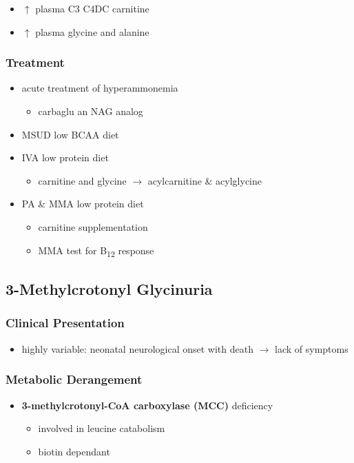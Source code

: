 \documentclass{scrartcl}
\begin{document}
\begin{enumerate}
\begin{itemize}
\item \(\uparrow\) plasma C3 \textpm{} C4DC carnitine
\item \(\uparrow\) plasma glycine and alanine
\end{itemize}
\end{enumerate}

\subsubsection{Treatment}
\label{sec:org70468b2}
\begin{itemize}
\item acute treatment of hyperammonemia
\begin{itemize}
\item carbaglu an NAG analog
\end{itemize}
\item MSUD low BCAA diet
\item IVA low protein diet
\begin{itemize}
\item carnitine and glycine \(\to\) acylcarnitine \& acylglycine
\end{itemize}
\item PA \& MMA low protein diet
\begin{itemize}
\item carnitine supplementation
\item MMA test for B\textsubscript{12} response
\end{itemize}
\end{itemize}

\subsection{3-Methylcrotonyl Glycinuria}
\label{sec:org30eafcc}
\subsubsection{Clinical Presentation}
\label{sec:orga210304}
\begin{itemize}
\item highly variable: neonatal neurological onset with death \(\to\) lack of symptoms
\end{itemize}
\subsubsection{Metabolic Derangement}
\label{sec:org0800baa}
\begin{itemize}
\item \textbf{3-methylcrotonyl-CoA carboxylase (MCC)} deficiency
\begin{itemize}
\item involved in leucine catabolism
\item biotin dependant
\end{itemize}
\end{itemize}
\end{document}
